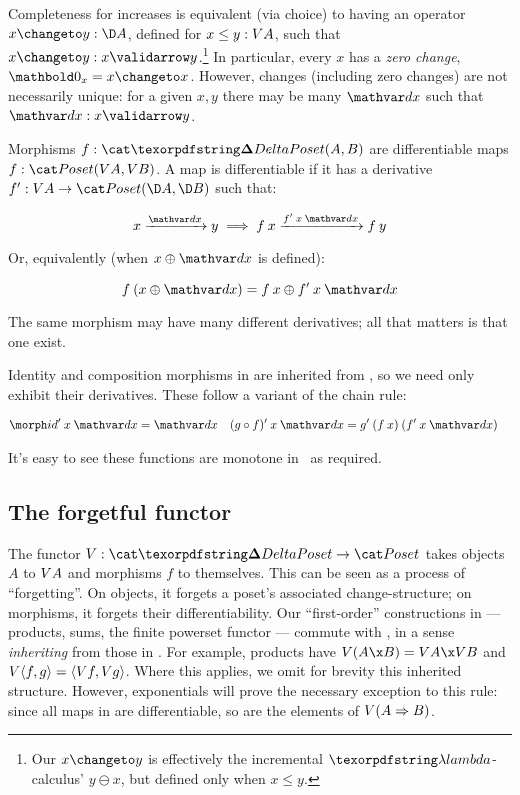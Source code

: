 \noindent Completeness for increases is equivalent (via choice) to having an
operator $x \changeto y : \chgs A$, defined for $x \le y : V A$, such that
$\valid{x \changeto y} x y$.\footnote{Our $x \changeto y$ is effectively the
  incremental $\fn$-calculus' $y \ominus x$, but defined only when $x \le y$.}
In particular, every $x$ has a \emph{zero change}, $\zero_x = x \changeto x$.
However, changes (including zero changes) are not necessarily unique: for a
given $x,y$ there may be many $\dx$ such that $\valid\dx x y$.

Morphisms $f : \CP(A, B)$ are differentiable maps $f : \Poset(\vals A, \vals
B)$. A map is differentiable if it has a derivative $\deriv f : \vals A \to
\Poset(\chgs A, \chgs B)$ such that:

\nopagebreak[2]
\[ \vld{\dx} x y \implies \vld{\deriv f\<x\<\dx}{f\<x}{f\<y}\]

\noindent Or, equivalently (when $x \upd \dx$ is defined):

\nopagebreak[2]
\[ f\<(x \upd \dx) = f\<x \upd \deriv f\<x\<\dx \]

\noindent
The same morphism may have many different derivatives; all that matters is that
one exist.

Identity and composition morphisms in \CP{} are inherited from \Poset{}, so we
need only exhibit their derivatives. These follow a variant of the chain rule:

\nopagebreak[2]
\begin{align*}
  \deriv\id \<x\<\dx &= \dx
  & \deriv{(g \circ f)} \<x\<\dx &= \deriv g \<(f\<x) \<(\deriv f\<x\<\dx)
\end{align*}

\noindent
It's easy to see these functions are monotone in \dx\ as required.


\subsection{The forgetful functor \valfn}
\label{sec:CP-vals}

The functor $\valfn : \CP \to \Poset$ takes objects $A$ to $V A$ and
morphisms $f$ to themselves. This can be seen as a process of ``forgetting''. On
objects, it forgets a poset's associated change-structure; on morphisms, it
forgets their differentiability.
%
Our ``first-order'' constructions in \CP{} --- products, sums, the finite
powerset functor --- commute with \valfn, in a sense \emph{inheriting} from
those in \Poset. For example, products have $\vals{(A \x B)} = \vals A \x \vals
B$ and $V{\langle{f,g}\rangle} = \langle{\ensuremath{V}f, \ensuremath{V}g}\rangle$.
%
Where this applies, we omit for brevity this inherited structure.
%
However, exponentials will prove the necessary exception to this rule: since all
maps in \CP{} are differentiable, so are the elements of $V{(A \Rightarrow B)}$.

